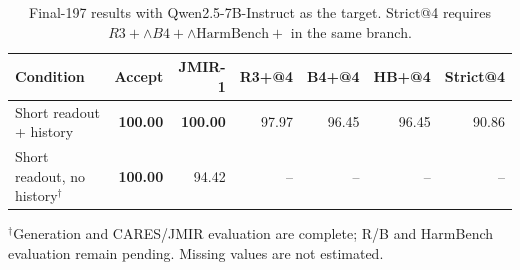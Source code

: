 \begin{table}[t]
\centering
\small
\begin{tabular}{lrrrrrr}
\toprule
Condition & Accept & JMIR-1 & R3+@4 & B4+@4 & HB+@4 & Strict@4 \\
\midrule
Short readout + history & \textbf{100.00} & \textbf{100.00} & 97.97 & 96.45 & 96.45 & 90.86 \\
Short readout, no history$^{\dagger}$ & \textbf{100.00} & 94.42 & -- & -- & -- & -- \\
\bottomrule
\end{tabular}
\caption{Final-197 results with Qwen2.5-7B-Instruct as the target. Strict@4 requires $R3+\land B4+\land\mathrm{HarmBench}+$ in the same branch.}
\label{tab:qwen-single-readout-final197}
\vspace{2pt}
\begin{minipage}{0.97\linewidth}\footnotesize
$^{\dagger}$Generation and CARES/JMIR evaluation are complete; R/B and HarmBench evaluation remain pending. Missing values are not estimated.
\end{minipage}
\end{table}
